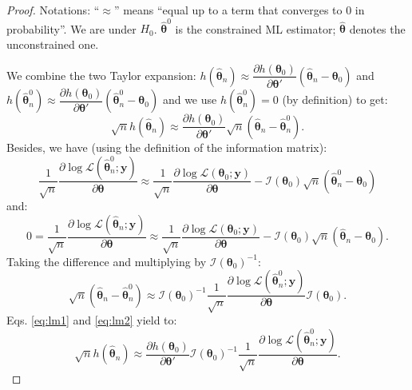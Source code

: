 \documentclass[
  12pt,
]{book}
\theoremstyle{definition}
\theoremstyle{definition}
\theoremstyle{definition}
\theoremstyle{definition}
\theoremstyle{remark}
\begin{document}
\begin{proof}
Notations: ``\(\approx\)'' means ``equal up to a term that converges to 0 in probability''. We are under \(H_0\). \(\hat{\boldsymbol\theta}^0\) is the constrained ML estimator; \(\hat{\boldsymbol\theta}\) denotes the unconstrained one.

We combine the two Taylor expansion: \(h(\hat{\boldsymbol\theta}_n) \approx \dfrac{\partial h(\boldsymbol\theta_0)}{\partial \boldsymbol\theta'}(\hat{\boldsymbol\theta}_n - \boldsymbol\theta_0)\) and \(h(\hat{\boldsymbol\theta}_n^0) \approx \dfrac{\partial h(\boldsymbol\theta_0)}{\partial \boldsymbol\theta'}(\hat{\boldsymbol\theta}_n^0 - \boldsymbol\theta_0)\) and we use \(h(\hat{\boldsymbol\theta}_n^0)=0\) (by definition) to get:
\begin{equation}
\sqrt{n}h(\hat{\boldsymbol\theta}_n) \approx \dfrac{\partial h(\boldsymbol\theta_0)}{\partial \boldsymbol\theta'}\sqrt{n}(\hat{\boldsymbol\theta}_n - \hat{\boldsymbol\theta}^0_n). \label{eq:lm1}
\end{equation}
Besides, we have (using the definition of the information matrix):
\begin{equation}
\frac{1}{\sqrt{n}}\frac{\partial \log \mathcal{L}(\hat{\boldsymbol\theta}^0_n;\mathbf{y})}{\partial \boldsymbol\theta} \approx
\frac{1}{\sqrt{n}}\frac{\partial \log \mathcal{L}(\boldsymbol\theta_0;\mathbf{y})}{\partial \boldsymbol\theta} - \mathcal{I}(\boldsymbol\theta_0)\sqrt{n}(\hat{\boldsymbol\theta}^0_n-\boldsymbol\theta_0) \label{eq:lm29}
\end{equation}
and:
\begin{equation}
0=\frac{1}{\sqrt{n}}\frac{\partial \log \mathcal{L}(\hat{\boldsymbol\theta}_n;\mathbf{y})}{\partial \boldsymbol\theta} \approx
\frac{1}{\sqrt{n}}\frac{\partial \log \mathcal{L}(\boldsymbol\theta_0;\mathbf{y})}{\partial \boldsymbol\theta} - \mathcal{I}(\boldsymbol\theta_0)\sqrt{n}(\hat{\boldsymbol\theta}_n-\boldsymbol\theta_0).\label{eq:lm30}
\end{equation}
Taking the difference and multiplying by \(\mathcal{I}(\boldsymbol\theta_0)^{-1}\):
\begin{equation}
\sqrt{n}(\hat{\boldsymbol\theta}_n-\hat{\boldsymbol\theta}_n^0) \approx
\mathcal{I}(\boldsymbol\theta_0)^{-1}\frac{1}{\sqrt{n}}\frac{\partial \log \mathcal{L}(\hat{\boldsymbol\theta}^0_n;\mathbf{y})}{\partial \boldsymbol\theta}
\mathcal{I}(\boldsymbol\theta_0).\label{eq:lm2}
\end{equation}
Eqs. \eqref{eq:lm1} and \eqref{eq:lm2} yield to:
\begin{equation}
\sqrt{n}h(\hat{\boldsymbol\theta}_n) \approx \dfrac{\partial h(\boldsymbol\theta_0)}{\partial \boldsymbol\theta'} \mathcal{I}(\boldsymbol\theta_0)^{-1}\frac{1}{\sqrt{n}}\frac{\partial \log \mathcal{L}(\hat{\boldsymbol\theta}^0_n;\mathbf{y})}{\partial \boldsymbol\theta}.\label{eq:lm3}
\end{equation}


\end{proof}
\end{document}
